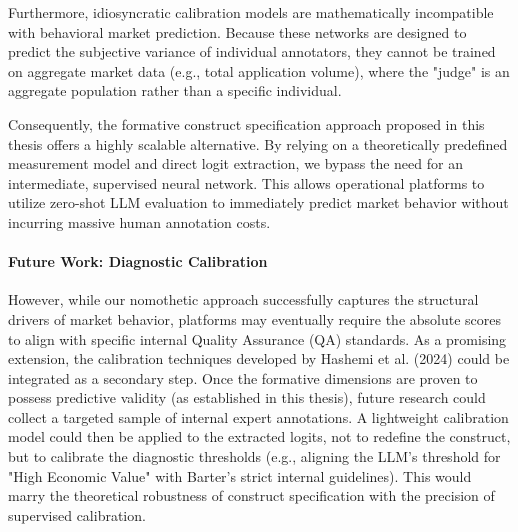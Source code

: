 Furthermore, idiosyncratic calibration models are mathematically incompatible with behavioral market prediction. Because these networks are designed to predict the subjective variance of individual annotators, they cannot be trained on aggregate market data (e.g., total application volume), where the "judge" is an aggregate population rather than a specific individual. 

Consequently, the formative construct specification approach proposed in this thesis offers a highly scalable alternative. By relying on a theoretically predefined measurement model and direct logit extraction, we bypass the need for an intermediate, supervised neural network. This allows operational platforms to utilize zero-shot LLM evaluation to immediately predict market behavior without incurring massive human annotation costs.

\paragraph{Future Work: Diagnostic Calibration}
However, while our nomothetic approach successfully captures the structural drivers of market behavior, platforms may eventually require the absolute scores to align with specific internal Quality Assurance (QA) standards. As a promising extension, the calibration techniques developed by Hashemi et al. (2024) could be integrated as a secondary step. Once the formative dimensions are proven to possess predictive validity (as established in this thesis), future research could collect a targeted sample of internal expert annotations. A lightweight calibration model could then be applied to the extracted logits, not to redefine the construct, but to calibrate the diagnostic thresholds (e.g., aligning the LLM's threshold for "High Economic Value" with Barter's strict internal guidelines). This would marry the theoretical robustness of construct specification with the precision of supervised calibration.